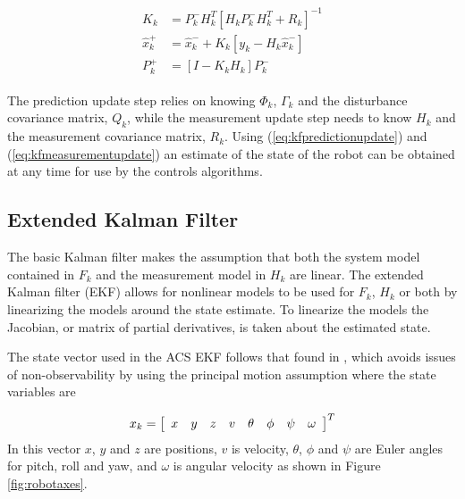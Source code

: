\begin{align}
\label{eq:kfmeasurementupdate}
\begin{split}
K_k &= P_k^-H_k^T\left[H_kP_k^-H_k^T + R_k\right]^{-1} \\
\hat{x}_k^+ &= \hat{x}_k^- + K_k\left[y_k - H_k\hat{x}_k^-\right] \\
P_k^+ &= \left[I - K_kH_k\right]P_k^-
\end{split}
\end{align}

The prediction update step relies on knowing $\Phi_k$, $\Gamma_k$ and the disturbance covariance matrix, $Q_k$, while the measurement update step needs to know $H_k$ and the measurement covariance matrix, $R_k$. Using (\ref{eq:kfpredictionupdate}) and (\ref{eq:kfmeasurementupdate}) an estimate of the state of the robot can be obtained at any time for use by the controls algorithms.

\subsection{Extended Kalman Filter}
\label{sec:extendedkf}
The basic Kalman filter makes the assumption that both the system model contained in $F_k$ and the measurement model in $H_k$ are linear. The extended Kalman filter (EKF) allows for nonlinear models to be used for $F_k$, $H_k$ or both by linearizing the models around the state estimate. To linearize the models the Jacobian, or matrix of partial derivatives, is taken about the estimated state.

The state vector used in the ACS EKF follows that found in \cite{Kelly_1994_338}, \cite{Kelly_1994_333} which avoids issues of non-observability by using the principal motion assumption where the state variables are

\begin{align*}
x_k = \left[\begin{array}{c c c c c c c c} x & y & z & v & \theta & \phi & \psi & \omega \end{array}\right]^T
\end{align*}
In this vector $x$, $y$ and $z$ are positions, $v$ is velocity, $\theta$, $\phi$ and $\psi$ are Euler angles for pitch, roll and yaw, and $\omega$ is angular velocity as shown in Figure \ref{fig:robotaxes}.

